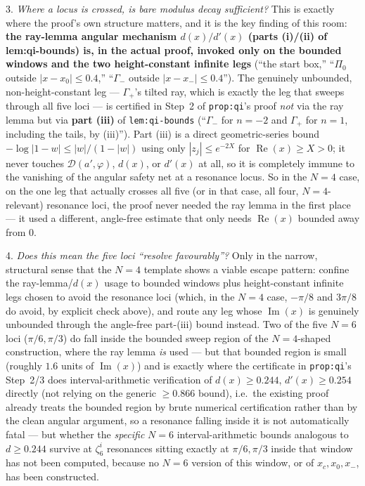 \documentclass[11pt]{article}
\begin{document}
3. \emph{Where a locus is crossed, is bare modulus decay sufficient?} This is exactly where the
proof's own structure matters, and it is the key finding of this room: \textbf{the ray-lemma
angular mechanism $d(x)/d'(x)$ (parts (i)/(ii) of lem:qi-bounds) is, in the actual proof, invoked
only on the bounded windows and the two height-constant infinite legs} (``the start box,'' ``$\Pi_0$
outside $|x-x_0|\le0.4$,'' ``$\Gamma_-$ outside $|x-x_-|\le0.4$''). The genuinely unbounded,
non-height-constant leg --- $\Gamma_+$'s tilted ray, which is exactly the leg that sweeps through
all five loci --- is certified in Step~2 of \texttt{prop:qi}'s proof \emph{not} via the ray lemma
but via \textbf{part (iii)} of \texttt{lem:qi-bounds} (``$\Gamma_-$ for $n=-2$ and $\Gamma_+$ for
$n=1$, including the tails, by (iii)''). Part (iii) is a direct geometric-series bound
$-\log|1-w|\le|w|/(1-|w|)$ using only $|z_j|\le e^{-2X}$ for $\operatorname{Re}(x)\ge X>0$; it
never touches $\mathcal D(a',\varphi)$, $d(x)$, or $d'(x)$ at all, so it is completely immune to
the vanishing of the angular safety net at a resonance locus. So in the $N=4$ case, on the one
leg that actually crosses all five (or in that case, all four, $N=4$-relevant) resonance loci,
the proof never needed the ray lemma in the first place --- it used a different, angle-free
estimate that only needs $\operatorname{Re}(x)$ bounded away from $0$.

4. \emph{Does this mean the five loci ``resolve favourably''?} Only in the narrow, structural
sense that the $N=4$ template shows a viable escape pattern: confine the ray-lemma/$d(x)$ usage
to bounded windows plus height-constant infinite legs chosen to avoid the resonance loci (which,
in the $N=4$ case, $-\pi/8$ and $3\pi/8$ do avoid, by explicit check above), and route any
leg whose $\operatorname{Im}(x)$ is genuinely unbounded through the angle-free part-(iii) bound
instead. Two of the five $N=6$ loci ($\pi/6,\pi/3$) do fall inside the bounded sweep region
of the $N=4$-shaped construction, where the ray lemma \emph{is} used --- but that bounded region
is small (roughly $1.6$ units of $\operatorname{Im}(x)$) and is exactly where the certificate
in \texttt{prop:qi}'s Step~2/3 does interval-arithmetic verification of $d(x)\ge0.244$,
$d'(x)\ge0.254$ directly (not relying on the generic $\ge0.866$ bound), i.e.\ the existing proof
already treats the bounded region by brute numerical certification rather than by the clean
angular argument, so a resonance falling inside it is not automatically fatal --- but whether the
\emph{specific} $N=6$ interval-arithmetic bounds analogous to $d\ge0.244$ survive at $\zeta_6^i$
resonances sitting exactly at $\pi/6,\pi/3$ inside that window has not been computed, because
no $N=6$ version of this window, or of $x_c,x_0,x_-$, has been constructed.
\end{document}
